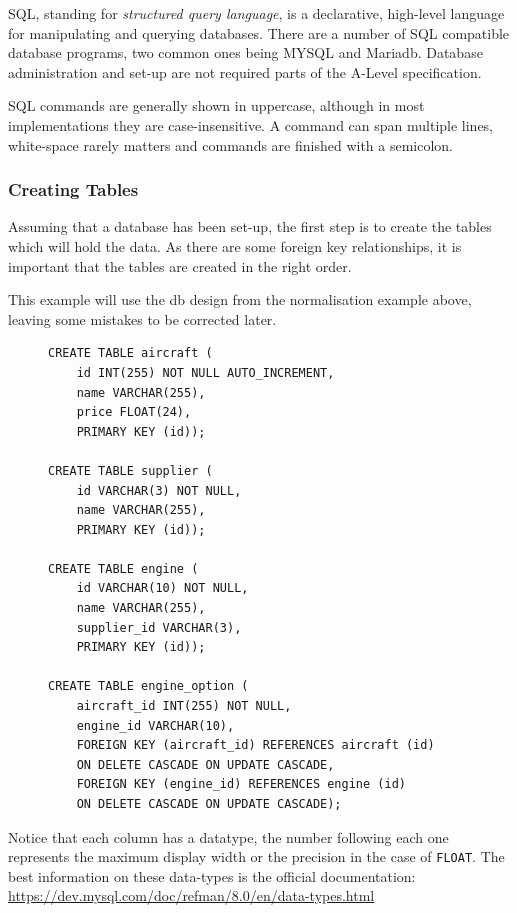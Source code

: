 \documentclass[10pt]{article}
\begin{document}
SQL, standing for \emph{structured query language}, is a declarative, high-level language for manipulating and querying databases. There are a number of SQL compatible database programs, two common ones being MYSQL and Mariadb. Database administration and set-up are not required parts of the A-Level specification.

SQL commands are generally shown in uppercase, although in most implementations they are case-insensitive. A command can span multiple lines, white-space rarely matters and commands are finished with a semicolon.

\subsubsection{Creating Tables}
\label{sec:org1e2aa80}

Assuming that a database has been set-up, the first step is to create the tables which will hold the data. As there are some foreign key relationships, it is important that the tables are created in the right order.

This example will use the db design from the normalisation example above, leaving some mistakes to be corrected later.

\begin{figure}[H]
\begin{verbatim}
CREATE TABLE aircraft (
    id INT(255) NOT NULL AUTO_INCREMENT,
    name VARCHAR(255),
    price FLOAT(24),
    PRIMARY KEY (id));

CREATE TABLE supplier (
    id VARCHAR(3) NOT NULL,
    name VARCHAR(255),
    PRIMARY KEY (id));

CREATE TABLE engine (
    id VARCHAR(10) NOT NULL,
    name VARCHAR(255),
    supplier_id VARCHAR(3),
    PRIMARY KEY (id));

CREATE TABLE engine_option (
    aircraft_id INT(255) NOT NULL,
    engine_id VARCHAR(10),
    FOREIGN KEY (aircraft_id) REFERENCES aircraft (id)
    ON DELETE CASCADE ON UPDATE CASCADE,
    FOREIGN KEY (engine_id) REFERENCES engine (id)
    ON DELETE CASCADE ON UPDATE CASCADE);
\end{verbatim}
\end{figure}

Notice that each column has a datatype, the number following each one represents the maximum display width or the precision in the case of \texttt{FLOAT}. The best information on these data-types is the official documentation: \url{https://dev.mysql.com/doc/refman/8.0/en/data-types.html}
\end{document}
